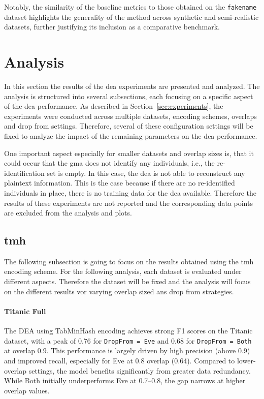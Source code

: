 Notably, the similarity of the baseline metrics to those obtained on the \texttt{fakename} dataset highlights the generality of the method across synthetic and semi-realistic datasets, further justifying its inclusion as a comparative benchmark.

\section{Analysis}  \label{sec:analysis}

In this section the results of the \ac{dea} experiments are presented and analyzed.
The analysis is structured into several subsections, each focusing on a specific aspect of the \ac{dea} performance.
As described in Section~\ref{sec:experiments}, the experiments were conducted across multiple datasets, encoding schemes, overlaps and drop from settings.
Therefore, several of these configuration settings will be fixed to analyze the impact of the remaining parameters on the \ac{dea} performance.

One important aspect especially for smaller datasets and overlap sizes is, that it could occur that the \ac{gma} does not identify any individuals, i.e., the re-identification set is empty.
In this case, the \ac{dea} is not able to reconstruct any plaintext information.
This is the case because if there are no re-identified individuals in place, there is no training data for the \ac{dea} available.
Therefore the results of these experiments are not reported and the corresponding data points are excluded from the analysis and plots.

\subsection{\ac{tmh}}

The following subsection is going to focus on the results obtained using the \ac{tmh} encoding scheme.
For the following analysis, each dataset is evaluated under different aspects.
Therefore the dataset will be fixed and the analysis will focus on the different results vor varying overlap sized ans drop from strategies.

\paragraph{Titanic Full}

The DEA using TabMinHash encoding achieves strong F1 scores on the Titanic dataset, with a peak of 0.76 for \texttt{DropFrom = Eve} and 0.68 for \texttt{DropFrom = Both} at overlap 0.9.
This performance is largely driven by high precision (above 0.9) and improved recall, especially for Eve at 0.8 overlap (0.64).
Compared to lower-overlap settings, the model benefits significantly from greater data redundancy.
While Both initially underperforms Eve at 0.7–0.8, the gap narrows at higher overlap values.

